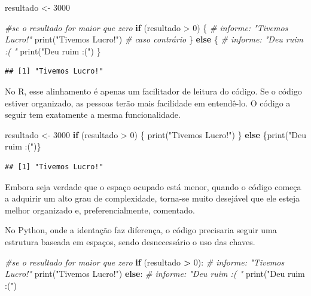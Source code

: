 \documentclass[
]{book}
\newenvironment{Shaded}{\begin{snugshade}}{\end{snugshade}}
\newcommand{\BuiltInTok}[1]{#1}
\newcommand{\CommentTok}[1]{\textcolor[rgb]{0.56,0.35,0.01}{\textit{#1}}}
\newcommand{\ControlFlowTok}[1]{\textcolor[rgb]{0.13,0.29,0.53}{\textbf{#1}}}
\newcommand{\DecValTok}[1]{\textcolor[rgb]{0.00,0.00,0.81}{#1}}
\newcommand{\FunctionTok}[1]{\textcolor[rgb]{0.00,0.00,0.00}{#1}}
\newcommand{\NormalTok}[1]{#1}
\newcommand{\OperatorTok}[1]{\textcolor[rgb]{0.81,0.36,0.00}{\textbf{#1}}}
\newcommand{\OtherTok}[1]{\textcolor[rgb]{0.56,0.35,0.01}{#1}}
\newcommand{\SpecialCharTok}[1]{\textcolor[rgb]{0.00,0.00,0.00}{#1}}
\newcommand{\StringTok}[1]{\textcolor[rgb]{0.31,0.60,0.02}{#1}}
\begin{document}
\begin{Shaded}
\begin{Highlighting}[]
\NormalTok{resultado }\OtherTok{\textless{}{-}} \DecValTok{3000}

\CommentTok{\#se o resultado for maior que zero}
\ControlFlowTok{if}\NormalTok{ (resultado }\SpecialCharTok{\textgreater{}} \DecValTok{0}\NormalTok{) \{ }
  \CommentTok{\# informe: "Tivemos Lucro!"}
  \FunctionTok{print}\NormalTok{(}\StringTok{"Tivemos Lucro!"}\NormalTok{) }
  \CommentTok{\# caso contrário}
\NormalTok{\} }\ControlFlowTok{else}\NormalTok{ \{  }
  \CommentTok{\# informe: "Deu ruim :( "}
  \FunctionTok{print}\NormalTok{(}\StringTok{"Deu ruim :("}\NormalTok{) }
\NormalTok{\}}
\end{Highlighting}
\end{Shaded}

\begin{verbatim}
## [1] "Tivemos Lucro!"
\end{verbatim}

No R, esse alinhamento é apenas um facilitador de leitura do código. Se o código estiver organizado, as pessoas terão mais facilidade em entendê-lo. O código a seguir tem exatamente a mesma funcionalidade.

\begin{Shaded}
\begin{Highlighting}[]
\NormalTok{resultado }\OtherTok{\textless{}{-}} \DecValTok{3000}
\ControlFlowTok{if}\NormalTok{ (resultado }\SpecialCharTok{\textgreater{}} \DecValTok{0}\NormalTok{) \{ }\FunctionTok{print}\NormalTok{(}\StringTok{"Tivemos Lucro!"}\NormalTok{) \} }\ControlFlowTok{else}\NormalTok{ \{}\FunctionTok{print}\NormalTok{(}\StringTok{"Deu ruim :("}\NormalTok{)\}}
\end{Highlighting}
\end{Shaded}

\begin{verbatim}
## [1] "Tivemos Lucro!"
\end{verbatim}

Embora seja verdade que o espaço ocupado está menor, quando o código começa a adquirir um alto grau de complexidade, torna-se muito desejável que ele esteja melhor organizado e, preferencialmente, comentado.

No Python, onde a identação faz diferença, o código precisaria seguir uma estrutura baseada em espaços, sendo desnecessário o uso das chaves.

\begin{Shaded}
\begin{Highlighting}[]
\CommentTok{\#se o resultado for maior que zero}
\ControlFlowTok{if}\NormalTok{ (resultado }\OperatorTok{\textgreater{}} \DecValTok{0}\NormalTok{):  }
  \CommentTok{\# informe: "Tivemos Lucro!"}
  \BuiltInTok{print}\NormalTok{(}\StringTok{"Tivemos Lucro!"}\NormalTok{) }
\ControlFlowTok{else}\NormalTok{:  }
  \CommentTok{\# informe: "Deu ruim :( "}
  \BuiltInTok{print}\NormalTok{(}\StringTok{"Deu ruim :("}\NormalTok{) }
\end{Highlighting}
\end{Shaded}
\end{document}
